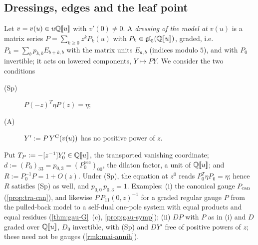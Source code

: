 
\subsection{Dressings, edges and the leaf point}
\label{sec:tra-dress}

\begin{defn}[dressings]
\label{def:tra-dressing}
Let $v = v(u)\in u\mathbb{Q}[\![ u ]\!]$ with $v'(0)\neq 0$. A \emph{dressing of the model at $v(u)$} is a matrix series $P = \sum_{k\geq 0}z^kP_k(u)$ with $P_k\in\mathfrak{gl}_5(\mathbb{Q}[\![ u ]\!])$, graded, i.e.\ $P_k = \sum_bp_{k,b}E_{b+k,b}$ with the matrix units $E_{a,b}$ (indices modulo $5$), and with $P_0$ invertible; it acts on lowered components, $Y\mapsto PY$. We consider the two conditions
\begin{description}
\item[(Sp)] $P(-z)^T\eta P(z) = \eta$;
\item[(A)] $Y' := P\,Y^{\mathrm{C}}(v(u))$ has no positive power of $z$.
\end{description}
Put $T_P := -[z^{-1}]Y'_0\in\mathbb{Q}[\![ u ]\!]$, the transported vanishing coordinate; $d := (P_0)_{33} = p_{0,3} = (P_0^{\mathrm{vec}})_{00}$, the dilaton factor, a unit of $\mathbb{Q}[\![ u ]\!]$; and $R := P_0^{-1}P = 1+O(z)$. Under (Sp), the equation at $z^0$ reads $P_0^T\eta P_0 = \eta$; hence $R$ satisfies (Sp) as well, and $p_{0,0}\,p_{0,3} = 1$. Examples: (i) the canonical gauge $P_{\mathrm{can}}$ (\cref{prop:tra-can}), and likewise $P\,P_{11}(0,z)^{-1}$ for a graded regular gauge $P$ from the pulled-back model to a self-dual one-pole system with equal products and equal residues (\cref{thm:gau-G}~(c), \cref{prop:gau-symp}); (ii) $DP$ with $P$ as in (i) and $D$ graded over $\mathbb{Q}[\![ u ]\!]$, $D_0$ invertible, with (Sp) and $DY'$ free of positive powers of $z$; these need not be gauges (\cref{rmk:mai-annih}).
\end{defn}

